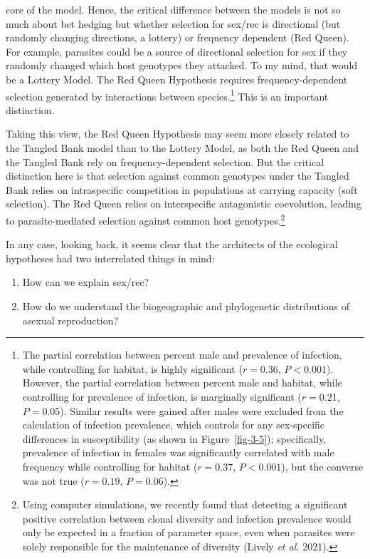 \documentclass[
  letterpaper,
]{book}
\providecommand{\tightlist}{%
  \setlength{\itemsep}{0pt}\setlength{\parskip}{0pt}}\usepackage{longtable,booktabs,array}
\begin{document}
core of the model. Hence, the critical difference between the models is
not so much about bet hedging but whether selection for sex/rec is
directional (but randomly changing directions, a lottery) or frequency
dependent (Red Queen). For example, parasites could be a source of
directional selection for sex if they randomly changed which host
genotypes they attacked. To my mind, that would be a Lottery Model. The
Red Queen Hypothesis requires frequency-dependent selection generated by
interactions between species.\footnote{The partial correlation between
  percent male and prevalence of infection, while controlling for
  habitat, is highly significant (\(r = 0.36\), \(P < 0.001\)). However,
  the partial correlation between percent male and habitat, while
  controlling for prevalence of infection, is marginally significant
  (\(r = 0.21\), \(P = 0.05\)). Similar results were gained after males
  were excluded from the calculation of infection prevalence, which
  controls for any sex-specific differences in susceptibility (as shown
  in Figure~\ref{fig-3-5}); specifically, prevalence of infection in
  females was significantly correlated with male frequency while
  controlling for habitat (\(r = 0.37\), \(P < 0.001\)), but the
  converse was not true (\(r = 0.19\), \(P = 0.06\)).} This is an
important distinction.

Taking this view, the Red Queen Hypothesis may seem more closely related
to the Tangled Bank model than to the Lottery Model, as both the Red
Queen and the Tangled Bank rely on frequency-dependent selection. But
the critical distinction here is that selection against common genotypes
under the Tangled Bank relies on intraspecific competition in
populations at carrying capacity (soft selection). The Red Queen relies
on interspecific antagonistic coevolution, leading to parasite-mediated
selection against common host genotypes.\footnote{Using computer
  simulations, we recently found that detecting a significant positive
  correlation between clonal diversity and infection prevalence would
  only be expected in a fraction of parameter space, even when parasites
  were solely responsible for the maintenance of diversity (Lively
  \emph{et al.} 2021).}

In any case, looking back, it seems clear that the architects of the
ecological hypotheses had two interrelated things in mind:

\begin{enumerate}
\def\labelenumi{\arabic{enumi}.}
\tightlist
\item
  How can we explain sex/rec?
\item
  How do we understand the biogeographic and phylogenetic distributions
  of asexual reproduction?
\end{enumerate}
\end{document}
